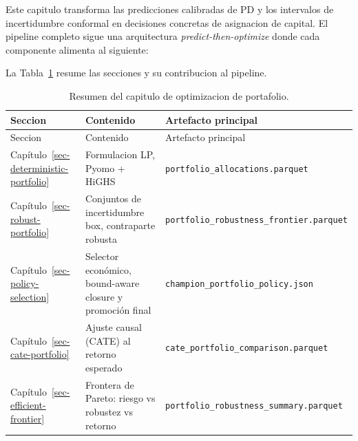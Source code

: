 \documentclass[
  spanish,
  11pt,
  letterpaper,
]{scrbook}
\theoremstyle{plain}
\theoremstyle{remark}
\begin{document}
Este capitulo transforma las predicciones calibradas de PD y los
intervalos de incertidumbre conformal en decisiones concretas de
asignacion de capital. El pipeline completo sigue una arquitectura
\emph{predict-then-optimize} donde cada componente alimenta al
siguiente:

La Tabla~\ref{tbl-portfolio-chapter-overview} resume las secciones y su
contribucion al pipeline.

\begin{longtable}[]{@{}
  >{\raggedright\arraybackslash}p{}
  >{\raggedright\arraybackslash}p{}
  >{\raggedright\arraybackslash}p{}@{}}
\caption{Resumen del capitulo de optimizacion de
portafolio.}\label{tbl-portfolio-chapter-overview}\tabularnewline
\toprule\noalign{}
\begin{minipage}[b]{\linewidth}\raggedright
Seccion
\end{minipage} & \begin{minipage}[b]{\linewidth}\raggedright
Contenido
\end{minipage} & \begin{minipage}[b]{\linewidth}\raggedright
Artefacto principal
\end{minipage} \\
\midrule\noalign{}
\endfirsthead
\toprule\noalign{}
\begin{minipage}[b]{\linewidth}\raggedright
Seccion
\end{minipage} & \begin{minipage}[b]{\linewidth}\raggedright
Contenido
\end{minipage} & \begin{minipage}[b]{\linewidth}\raggedright
Artefacto principal
\end{minipage} \\
\midrule\noalign{}
\endhead
\bottomrule\noalign{}
\endlastfoot
Capítulo~\ref{sec-deterministic-portfolio} & Formulacion LP, Pyomo +
HiGHS & \texttt{portfolio\_allocations.parquet} \\
Capítulo~\ref{sec-robust-portfolio} & Conjuntos de incertidumbre box,
contraparte robusta &
\texttt{portfolio\_robustness\_frontier.parquet} \\
Capítulo~\ref{sec-policy-selection} & Selector económico, bound-aware
closure y promoción final & \texttt{champion\_portfolio\_policy.json} \\
Capítulo~\ref{sec-cate-portfolio} & Ajuste causal (CATE) al retorno
esperado & \texttt{cate\_portfolio\_comparison.parquet} \\
Capítulo~\ref{sec-efficient-frontier} & Frontera de Pareto: riesgo vs
robustez vs retorno & \texttt{portfolio\_robustness\_summary.parquet} \\
\end{longtable}
\end{document}
